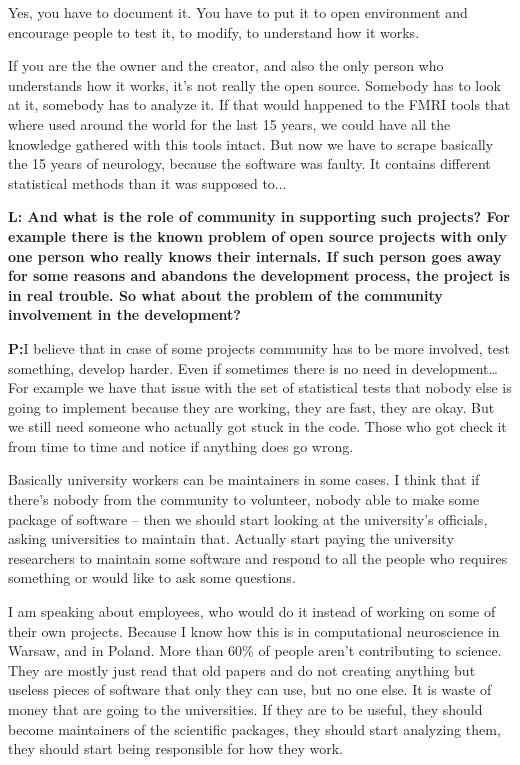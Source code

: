 \documentclass[10pt, a5paper]{article}
\begin{document}
\begin{Parallel}[p]{}{}
{Yes, you have to document it. You have to put it to open environment and encourage people to test it, to modify, to understand how it works.

If you are the the owner and the creator, and also the only person who understands how it works, it's not really the open source. Somebody has to look at it, somebody has to analyze it. If that would happened to the FMRI tools that where used around the world for the last 15 years, we could have all the knowledge gathered with this tools intact. But now we have to scrape basically the 15 years of neurology, because the software was faulty. It contains different statistical methods than it was supposed to...

{\noindent \bf L: And what is the role of community in supporting such projects? For example there is the known problem of open source projects with only one person who really knows their internals. If such person goes away for some reasons and abandons the development process, the project is in real trouble. So what about the problem of the community involvement in the development?}

{\noindent \bf P:}I believe that in case of some projects community has to be more involved, test something, develop harder. Even if sometimes there is no need in development… For example we have that issue with the set of statistical tests that nobody else is going to implement because they are working, they are fast, they are okay. But we still need someone who actually got stuck in the code. Those who got check it from time to time and notice if anything does go wrong. 

Basically university workers can be maintainers in some cases. I think that if there's nobody from the community to volunteer, nobody able to make some package of software – then we should start looking at the university's officials, asking universities to maintain that. Actually start paying the university researchers to maintain some software and respond to all the people who requires something or would like to ask some questions. 

I am speaking about employees, who would do it instead of working on some of their own projects. Because I know how this is in computational neuroscience in Warsaw, and in Poland. More than 60\% of people aren’t contributing to science. They are mostly just read that old papers and do not creating anything but useless pieces of software that only they can use, but no one else. It is waste of money that are going to the universities. If they are to be useful, they should become maintainers of the scientific packages, they should start analyzing them, they should start being responsible for how they work.

}
\end{Parallel}
\end{document}
